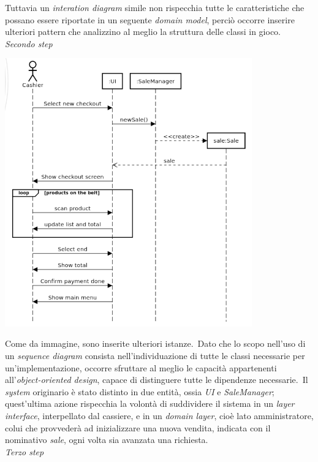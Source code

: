 \documentclass{article}
\begin{document}
Tuttavia un \textit{interation diagram} simile non rispecchia tutte le caratteristiche che possano essere riportate in un seguente \textit{domain model}, perciò occorre inserire ulteriori pattern che analizzino al meglio la struttura delle classi in gioco.\vspace*{14pt}\\
\textit{Secondo step}
\begin{center}
    \includegraphics[width=0.8\textwidth]{foto 2.png}
\end{center}
Come da immagine, sono inserite ulteriori istanze.\ Dato che lo scopo nell'uso di un \textit{sequence diagram} consista nell'individuazione di tutte le classi necessarie per un'implementazione, occorre sfruttare al meglio le capacità appartenenti all'\textit{object-oriented design}, capace di distinguere tutte le dipendenze necessarie.\ Il \textit{system} originario è stato distinto in due entità, ossia \textit{UI} e \textit{SaleManager}; quest'ultima azione rispecchia la volontà di suddividere il sistema in un \textit{layer interface}, interpellato dal cassiere, e in un \textit{domain layer}, cioè lato amministratore, colui che provvederà ad inizializzare una nuova vendita, indicata con il nominativo \textit{sale}, ogni volta sia avanzata una richiesta.\vspace*{14pt}\\
\textit{Terzo step}
\end{document}
